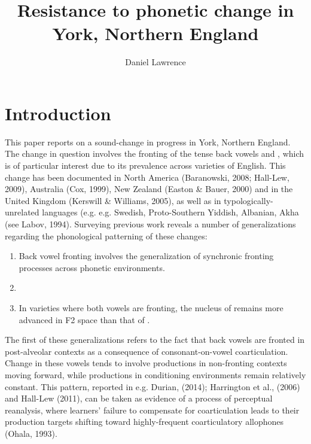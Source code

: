 \documentclass[12pt]{article}
\title{Resistance to phonetic change in York, Northern England}
\author{Daniel Lawrence}
\begin{document}
\maketitle

\section{Introduction}
This paper reports on a sound-change in progress in York, Northern England. The change in question involves the fronting of the tense back vowels  and , which is of particular interest due to its prevalence across varieties of English. This change has been documented in North America (Baranowski, 2008; Hall-Lew, 2009), Australia (Cox, 1999), New Zealand (Easton \& Bauer, 2000) and in the United Kingdom (Kerswill \& Williams, 2005), as well as in typologically-unrelated languages (e.g. e.g. Swedish, Proto-Southern Yiddish, Albanian, Akha (see Labov, 1994). Surveying previous work reveals a number of generalizations regarding the phonological patterning of these changes:


\begin{enumerate}
\item{Back vowel fronting involves the generalization of synchronic fronting processes across phonetic environments.}
\item{}
\item{In varieties where both vowels are fronting, the nucleus of  remains more advanced in F2 space than that of .}
\end{enumerate}

The first of these generalizations refers to the fact that back vowels are fronted in post-alveolar contexts as a consequence of consonant-on-vowel coarticulation. Change in these vowels tends to involve productions in non-fronting contexts moving forward, while productions in conditioning environments remain relatively constant. This pattern, reported in e.g. Durian, (2014); Harrington et al., (2006) and Hall-Lew (2011), can be taken as evidence of a process of perceptual reanalysis, where learners' failure to compensate for coarticulation leads to their production targets shifting toward highly-frequent coarticulatory allophones (Ohala, 1993). 
\end{document}
